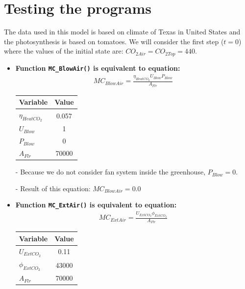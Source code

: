 \documentclass[a4paper]{article}
\numberwithin{equation}{section}
\begin{document}
\section{Testing the programs}
The data used in this model is based on climate of Texas in United States and the photosynthesis is based on tomatoes. We will consider the first step (\(t = 0\)) where the values of the initial state are: \(CO_{2Air} = CO_{2Top} = 440\).
\begin{itemize}
  \item \textbf{Function \texttt{MC\_BlowAir()} is equivalent to equation:}
        \begin{align*}
          MC_{BlowAir} = \frac{\eta_{HeatCO_2}U_{Blow}P_{Blow}}{A_{Flr}}
        \end{align*}

        \begin{table}[H]
          \centering
          \begin{tabular}{@{}lS@{}}
            \toprule
            \textbf{Variable}   & \textbf{Value} \\
            \midrule
            \(\eta_{HeatCO_2}\) & 0.057          \\
            \(U_{Blow}\)        & 1              \\
            \(P_{Blow}\)        & 0              \\
            \(A_{Flr}\)         & 70000          \\
            \bottomrule
          \end{tabular}
        \end{table}

  \item[-] Because we do not consider fan system inside the greenhouse, \(P_{Blow} = 0\).
  \item[-] Result of this equation: \(MC_{BlowAir} = 0.0\)

  \item \textbf{Function \texttt{MC\_ExtAir()} is equivalent to equation:}
        \begin{align*}
          MC_{ExtAir} = \frac{U_{ExtCO_2}\phi_{ExtCO_2}}{A_{Flr}}
        \end{align*}

        \begin{table}[H]
          \centering
          \begin{tabular}{@{}lS@{}}
            \toprule
            \textbf{Variable}  & \textbf{Value} \\
            \midrule
            \(U_{ExtCO_2}\)    & 0.11           \\
            \(\phi_{ExtCO_2}\) & 43000          \\
            \(A_{Flr}\)        & 70000          \\
            \bottomrule
          \end{tabular}
        \end{table}


\end{itemize}
\end{document}
